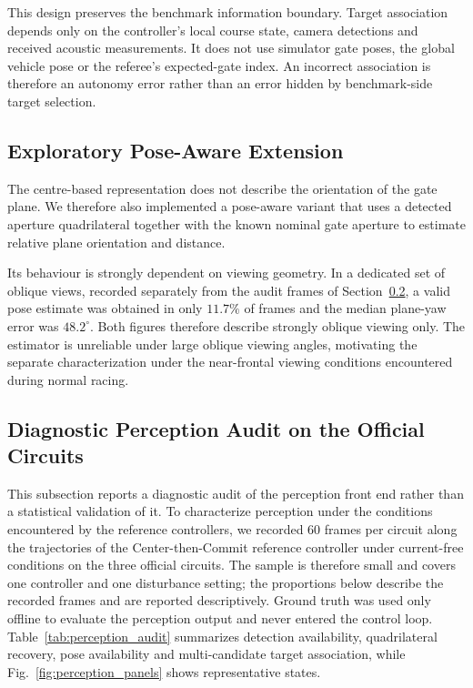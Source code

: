 This design preserves the benchmark information boundary. Target association
depends only on the controller's local course state, camera detections and
received acoustic measurements. It does not use simulator gate poses, the global
vehicle pose or the referee's expected-gate index. An incorrect association is
therefore an autonomy error rather than an error hidden by benchmark-side target
selection.


\subsection{Exploratory Pose-Aware Extension}
\label{sec:perception_pose}

The centre-based representation does not describe the orientation of the gate
plane. We therefore also implemented a pose-aware variant that uses a detected
aperture quadrilateral together with the known nominal gate aperture to estimate
relative plane orientation and distance.

Its behaviour is strongly dependent on viewing geometry. In a dedicated set of
oblique views, recorded separately from the audit frames of
Section~\ref{sec:perception_audit}, a valid pose estimate was obtained in only
$11.7\%$ of frames and the median plane-yaw error was $48.2^\circ$. Both figures
therefore describe strongly oblique viewing only. The estimator is unreliable
under large oblique viewing angles, motivating the separate characterization
under the near-frontal viewing conditions encountered during normal racing.


\subsection{Diagnostic Perception Audit on the Official Circuits}
\label{sec:perception_audit}

This subsection reports a diagnostic audit of the perception front end rather
than a statistical validation of it. To characterize perception under the
conditions encountered by the reference controllers, we recorded 60 frames per
circuit along the trajectories of the Center-then-Commit reference controller
under current-free conditions on the three official circuits. The sample is
therefore small and covers one controller and one disturbance setting; the
proportions below describe the recorded frames and are reported descriptively.
Ground truth was used only offline to evaluate the perception output and never
entered the control loop. Table~\ref{tab:perception_audit} summarizes detection
availability, quadrilateral recovery, pose availability and multi-candidate
target association, while
Fig.~\ref{fig:perception_panels} shows representative states.

